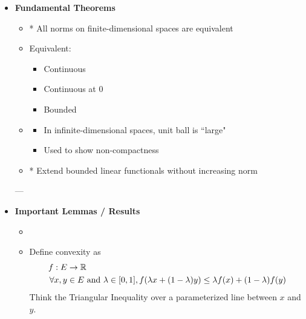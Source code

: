 \documentclass[12pt,a4paper]{report}
\begin{document}
\begin{description}
\begin{itemize}
---

    \item \textbf{Fundamental Theorems}

            \begin{itemize}
            \item \textit{}

  * All norms on finite-dimensional spaces are equivalent

            \item \textit{}
  Equivalent:

            \begin{itemize}
                 \item   Continuous
                 \item   Continuous at 0
                 \item   Bounded
            \end{itemize}

            \item \textit{}

            \begin{itemize}
                 \item In infinite-dimensional spaces, unit ball is ``large" 
                 \item Used to show non-compactness
            \end{itemize}

            \item \textit{}

  * Extend bounded linear functionals without increasing norm

            \end{itemize}
---

    \item \textbf{Important Lemmas / Results}

            \begin{itemize}
            \item \textit{}
            \item \textit{}
			
			Define convexity as
			\begin{align*}
				f: E &\to \mathbb{R} \\
				\forall x,y &\in E\text{ and }\lambda\in[0,1], f(\lambda x+(1-\lambda)y)\le \lambda f(x)+(1-\lambda)f(y)
			\end{align*}Think the Triangular Inequality over a parameterized line between $x$ and $y$.\\


\end{itemize}
\end{itemize}
\end{description}
\end{document}
